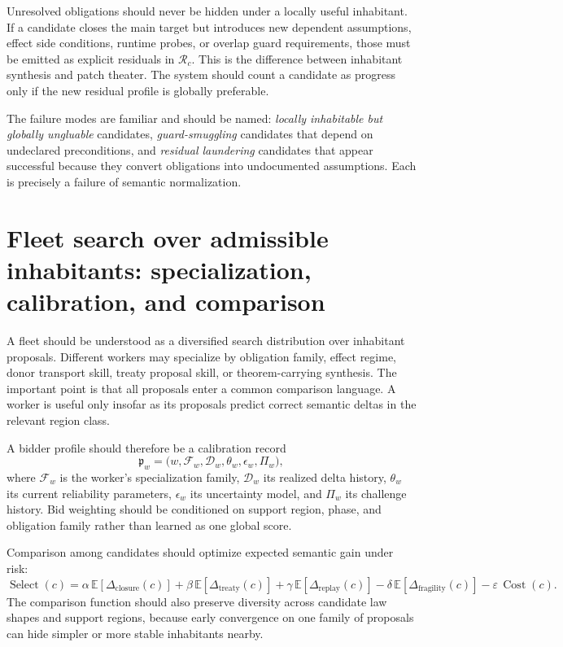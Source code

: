 \documentclass[11pt]{report}
\begin{document}
Unresolved obligations should never be hidden under a locally useful inhabitant. If a candidate closes the main target but introduces new dependent assumptions, effect side conditions, runtime probes, or overlap guard requirements, those must be emitted as explicit residuals in $\mathcal{R}_c$. This is the difference between inhabitant synthesis and patch theater. The system should count a candidate as progress only if the new residual profile is globally preferable.

The failure modes are familiar and should be named: \emph{locally inhabitable but globally ungluable} candidates, \emph{guard-smuggling} candidates that depend on undeclared preconditions, and \emph{residual laundering} candidates that appear successful because they convert obligations into undocumented assumptions. Each is precisely a failure of semantic normalization.

\section{Fleet search over admissible inhabitants: specialization, calibration, and comparison}
A fleet should be understood as a diversified search distribution over inhabitant proposals. Different workers may specialize by obligation family, effect regime, donor transport skill, treaty proposal skill, or theorem-carrying synthesis. The important point is that all proposals enter a common comparison language. A worker is useful only insofar as its proposals predict correct semantic deltas in the relevant region class.

A bidder profile should therefore be a calibration record
\[
\mathfrak{p}_w
=
\bigl(
w,
\mathcal{F}_w,
\mathcal{D}_w,
\theta_w,
\epsilon_w,
\Pi_w
\bigr),
\]
where $\mathcal{F}_w$ is the worker's specialization family, $\mathcal{D}_w$ its realized delta history, $\theta_w$ its current reliability parameters, $\epsilon_w$ its uncertainty model, and $\Pi_w$ its challenge history. Bid weighting should be conditioned on support region, phase, and obligation family rather than learned as one global score.

Comparison among candidates should optimize expected semantic gain under risk:
\[
\operatorname{Select}(c)
=
\alpha \,\mathbb{E}[\Delta_{\mathrm{closure}}(c)]
+
\beta \,\mathbb{E}[\Delta_{\mathrm{treaty}}(c)]
+
\gamma \,\mathbb{E}[\Delta_{\mathrm{replay}}(c)]
-
\delta \,\mathbb{E}[\Delta_{\mathrm{fragility}}(c)]
-
\varepsilon \,\operatorname{Cost}(c).
\]
The comparison function should also preserve diversity across candidate law shapes and support regions, because early convergence on one family of proposals can hide simpler or more stable inhabitants nearby.
\end{document}
